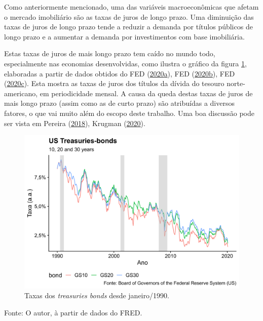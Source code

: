 \documentclass[
	12pt,				%
	oneside,			%
	a4paper,			%
	chapter=TITLE,		%
	section=TITLE,		%
	english,			%
	brazil				%
	]{abntex2}
\newcommand{\bcenter}{\begin{center}}
\newcommand{\ecenter}{\end{center}}
\DeclareRobustCommand{\firstsecond}[2]{#1}
\begin{document}
Como anteriormente mencionado, uma das variáveis macroeconômicas que afetam o
mercado imobiliário são as taxas de juros de longo prazo. Uma diminuição das
taxas de juros de longo prazo tende a reduzir a demanda por títulos públicos de
longo prazo e a aumentar a demanda por investimentos com base imobiliária.

Estas taxas de juros de mais longo prazo tem caído no mundo todo, especialmente
nas economias desenvolvidas, como ilustra o gráfico da figura \ref{fig:yields},
elaboradas a partir de dados obtidos do \firstsecond{\gls{FED}}{Board of Governors of the Federal Reserve System (US)} (\protect\hyperlink{ref-fredgs10}{2020}\protect\hyperlink{ref-fredgs10}{a}), \firstsecond{\gls{FED}}{Board of Governors of the Federal Reserve System (US)} (\protect\hyperlink{ref-fredgs20}{2020}\protect\hyperlink{ref-fredgs20}{b}), \firstsecond{\gls{FED}}{Board of Governors of the Federal Reserve System (US)} (\protect\hyperlink{ref-fredgs30}{2020}\protect\hyperlink{ref-fredgs30}{c}). Esta
mostra as taxas de juros dos títulos da dívida do tesouro norte-americano,
em periodicidade mensal. A causa da queda destas taxas de juros de mais longo
prazo (assim como as de curto prazo) são atribuídas a diversos fatores, o que
vai muito além do escopo deste trabalho. Uma boa discussão pode ser vista em
Pereira (\protect\hyperlink{ref-bresser2018}{2018}), Krugman (\protect\hyperlink{ref-krugman2020}{2020}).
\begin{figure}[H]

{\centering \includegraphics[width=0.7\linewidth]{images/yields-1} 

}

\caption{Taxas dos \emph{treasuries bonds} desde janeiro/1990.}\label{fig:yields}
\end{figure}
\bcenter

Fonte: O autor, à partir de dados do \gls{FRED}.
\ecenter
\end{document}

